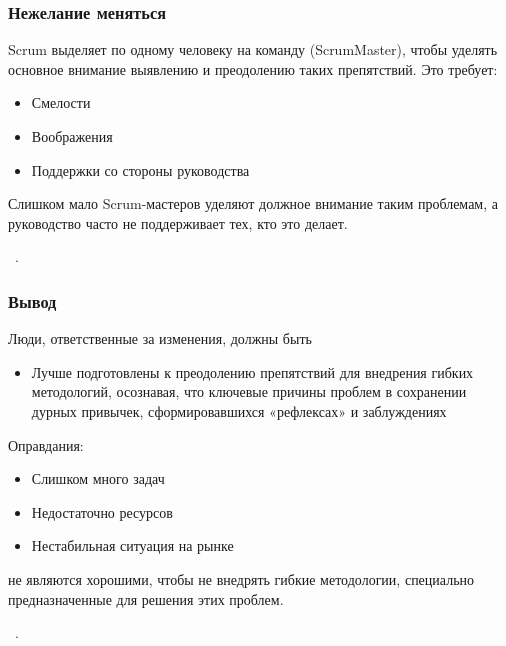 \documentclass{../industrial-development}
\begin{document}

\begin{frame} \frametitle{Нежелание меняться}
		Scrum выделяет по одному человеку на команду (ScrumMaster), чтобы уделять основное внимание выявлению и преодолению таких препятствий. \newline
		Это требует:
		\begin{itemize}
			\item Смелости
			\item Воображения 
			\item Поддержки со стороны руководства
		
		\end{itemize}
		Слишком мало Scrum-мастеров уделяют должное внимание таким проблемам, а руководство часто не поддерживает тех, кто это делает. 
\end{frame}

\lecturenotes
~\cite{Fowler}.


\begin{frame} \frametitle{Вывод}
Люди, ответственные за изменения, должны быть
  \begin{itemize}
		\item Лучше подготовлены к преодолению препятствий для внедрения гибких методологий, осознавая, что ключевые причины проблем в сохранении дурных привычек, сформировавшихся «рефлексах» и заблуждениях
		\end{itemize}
		Оправдания:
		\begin{itemize}
		\item Слишком много задач
		\item Недостаточно ресурсов
		\item Нестабильная ситуация на рынке
		\end{itemize}
		не являются хорошими, чтобы не внедрять гибкие методологии, специально предназначенные для решения этих проблем.

\end{frame}

\lecturenotes
~\cite{Fowler}.

\end{document}
